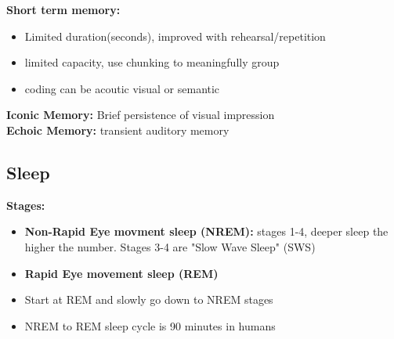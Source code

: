 \documentclass{article}
\begin{document}
\textbf{Short term memory:} 
\begin{itemize}
    \item Limited duration(seconds), improved with rehearsal/repetition
    \item limited capacity, use chunking to meaningfully group
    \item coding can be acoutic visual or semantic
\end{itemize}
\textbf{Iconic Memory:} Brief persistence of visual impression \\
\textbf{Echoic Memory:} transient auditory memory

\subsection{Sleep}
\noindent\textbf{Stages:}
\begin{itemize}
    \item \textbf{Non-Rapid Eye movment sleep (NREM):} stages 1-4, deeper sleep the higher the number. Stages 3-4 are "Slow Wave Sleep" (SWS)
    \item \textbf{Rapid Eye movement sleep (REM)}
    \item Start at REM and slowly go down to NREM stages
    \item NREM to REM sleep cycle is 90 minutes in humans
\end{itemize}
\end{document}
